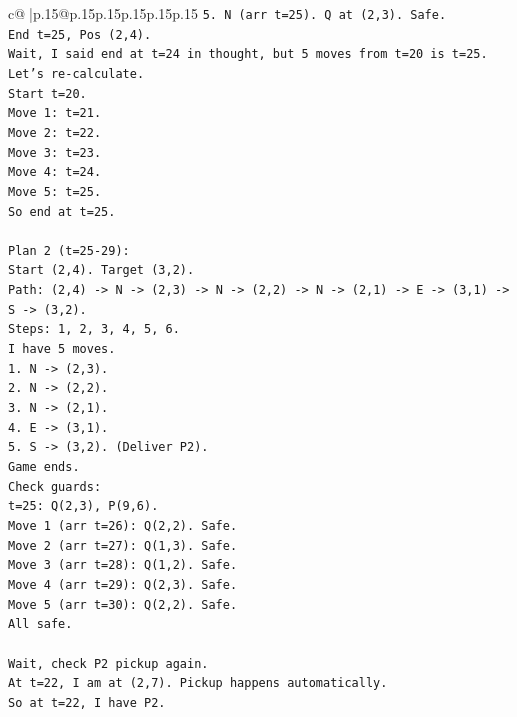 \documentclass{article}
\begin{document}
{\begin{supertabular}{c@{$\;$}|p{.15\linewidth}@{}p{.15\linewidth}p{.15\linewidth}p{.15\linewidth}p{.15\linewidth}p{.15\linewidth}}
{{{\texttt{5. N (arr t=25). Q at (2,3). Safe.} \\
\texttt{End t=25, Pos (2,4).} \\
\texttt{Wait, I said end at t=24 in thought, but 5 moves from t=20 is t=25.} \\
\texttt{Let's re{-}calculate.} \\
\texttt{Start t=20.} \\
\texttt{Move 1: t=21.} \\
\texttt{Move 2: t=22.} \\
\texttt{Move 3: t=23.} \\
\texttt{Move 4: t=24.} \\
\texttt{Move 5: t=25.} \\
\texttt{So end at t=25.} \\
\\ 
\texttt{Plan 2 (t=25{-}29):} \\
\texttt{Start (2,4). Target (3,2).} \\
\texttt{Path: (2,4) {-}> N {-}> (2,3) {-}> N {-}> (2,2) {-}> N {-}> (2,1) {-}> E {-}> (3,1) {-}> S {-}> (3,2).} \\
\texttt{Steps: 1, 2, 3, 4, 5, 6.} \\
\texttt{I have 5 moves.} \\
\texttt{1. N {-}> (2,3).} \\
\texttt{2. N {-}> (2,2).} \\
\texttt{3. N {-}> (2,1).} \\
\texttt{4. E {-}> (3,1).} \\
\texttt{5. S {-}> (3,2). (Deliver P2).} \\
\texttt{Game ends.} \\
\texttt{Check guards:} \\
\texttt{t=25: Q(2,3), P(9,6).} \\
\texttt{Move 1 (arr t=26): Q(2,2). Safe.} \\
\texttt{Move 2 (arr t=27): Q(1,3). Safe.} \\
\texttt{Move 3 (arr t=28): Q(1,2). Safe.} \\
\texttt{Move 4 (arr t=29): Q(2,3). Safe.} \\
\texttt{Move 5 (arr t=30): Q(2,2). Safe.} \\
\texttt{All safe.} \\
\\ 
\texttt{Wait, check P2 pickup again.} \\
\texttt{At t=22, I am at (2,7). Pickup happens automatically.} \\
\texttt{So at t=22, I have P2.} \\
}}}
\end{supertabular}}
\end{document}
